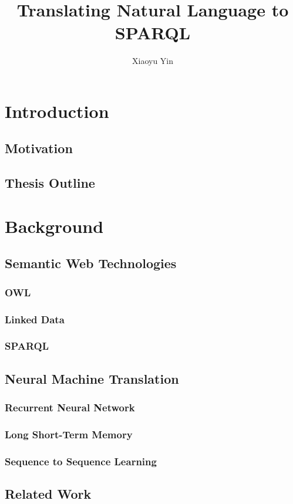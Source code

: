 \documentclass[hyperref, lof, lot, noproblem, masterofscience]{cgvpub}
\author{Xiaoyu Yin}
\title{Translating Natural Language to SPARQL}
\begin{document}
\chapter{Introduction}

\section{Motivation}
\section{Thesis Outline}



\chapter{Background}

\section{Semantic Web Technologies}
\subsection{OWL}
\subsection{Linked Data}
\subsection{SPARQL}

\section{Neural Machine Translation}
\subsection{Recurrent Neural Network}
\subsection{Long Short-Term Memory}
\subsection{Sequence to Sequence Learning}

\section{Related Work}
\end{document}
